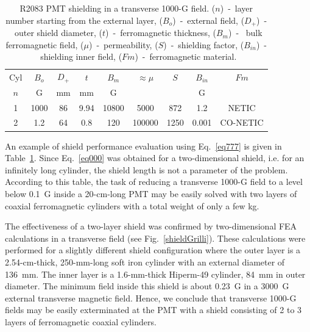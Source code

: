\documentclass[12pt]{article}
\begin{document}
\begin{table}[htbp]
\begin{center}
\begin{tabular}{|c|c|c|c|c|c|c|c|c|} \hline
Cyl &$B_{o}$ & $D_+$ & $t$ & $B_m$ & $\approx\mu$ & $S$ & $B_{in}$ & $Fm$ \\
$n$ &  G     & mm    & mm  & G     &             &     & G       &   \\ \hline
1   & 1000& 86 & 9.94 & 10800 & 5000   & 872  & 1.2   & NETIC \\ \hline
2   & 1.2 & 64 & 0.8  &  120  & 100000 & 1250 & 0.001 & CO-NETIC \\ \hline
\end{tabular}
\end{center}
\caption{R2083 PMT shielding in a transverse 1000-G field. ($n$)~-~layer 
number starting from the external layer, ($B_{o}$)~-~external field,
($D_+$)~-~outer shield diameter, ($t$)~-~ferromagnetic thickness, ($B_m$)~-~
bulk ferromagnetic field, ($\mu$)~-~permeability, ($S$)~-~shielding factor,
($B_{in}$)~-~shielding inner field, ($Fm$)~-~ferromagnetic material.}
\label{ca001}
\end{table}

An example of shield performance evaluation using Eq.~\ref{eq777} is given
in Table~\ref{ca001}. Since Eq.~\ref{eq000} was obtained for a two-dimensional 
shield, i.e. for an infinitely long cylinder, the shield length is not a parameter 
of the problem. According to this table, the task of reducing a transverse 1000-G 
field to a level below 0.1~G inside a 20-cm-long PMT may be easily solved with two 
layers of coaxial ferromagnetic cylinders with a total weight of only a few kg.
 
The effectiveness of a two-layer shield was confirmed by two-dimensional FEA
calculations in a transverse field (see Fig.~\ref{shieldGrilli}). These 
calculations were performed for a slightly different shield configuration where 
the outer layer is a 2.54-cm-thick, 250-mm-long soft iron cylinder with an external 
diameter of 136~mm. The inner layer is a 1.6-mm-thick Hiperm-49 cylinder, 84~mm in 
outer diameter. The minimum field inside this shield is about 0.23~G in a 3000~G 
external transverse magnetic field. Hence, we conclude that transverse 1000-G 
fields may be easily exterminated at the PMT with a shield consisting of 2 to 3 
layers of ferromagnetic coaxial cylinders.  
 
\end{document}
